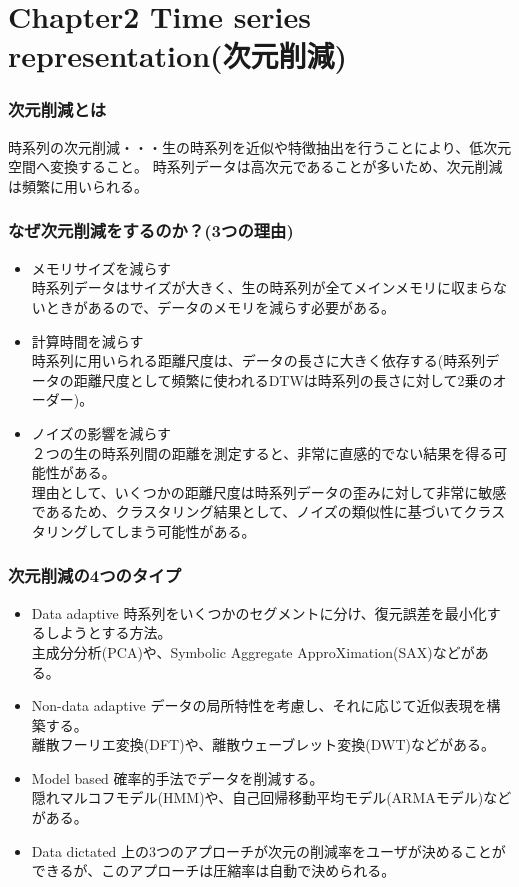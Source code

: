 \documentclass[dvipdfmx,11pt,notheorems]{beamer}
\theoremstyle{definition}
\begin{document}
\section{Chapter2 Time series representation(次元削減)}
\begin{frame}\frametitle{次元削減とは}

時系列の次元削減・・・生の時系列を近似や特徴抽出を行うことにより、低次元空間へ変換すること。
\newline
\newline
\newline
時系列データは高次元であることが多いため、次元削減は頻繁に用いられる。
\end{frame}



\begin{frame}\frametitle{なぜ次元削減をするのか？(3つの理由)}
\begin{itemize}
\item メモリサイズを減らす\\
時系列データはサイズが大きく、生の時系列が全てメインメモリに収まらないときがあるので、データのメモリを減らす必要がある。
\item 計算時間を減らす\\
時系列に用いられる距離尺度は、データの長さに大きく依存する(時系列データの距離尺度として頻繁に使われるDTWは時系列の長さに対して2乗のオーダー)。
\item ノイズの影響を減らす\\
２つの生の時系列間の距離を測定すると、非常に直感的でない結果を得る可能性がある。\\
理由として、いくつかの距離尺度は時系列データの歪みに対して非常に敏感であるため、クラスタリング結果として、ノイズの類似性に基づいてクラスタリングしてしまう可能性がある。

\end{itemize}
\end{frame}


\begin{frame}\frametitle{次元削減の4つのタイプ}
\begin{itemize}
\item Data adaptive
時系列をいくつかのセグメントに分け、復元誤差を最小化するしようとする方法。\\
主成分分析(PCA)や、Symbolic Aggregate ApproXimation(SAX)などがある。
\item Non-data adaptive
データの局所特性を考慮し、それに応じて近似表現を構築する。\\
離散フーリエ変換(DFT)や、離散ウェーブレット変換(DWT)などがある。
\item Model based
確率的手法でデータを削減する。\\
隠れマルコフモデル(HMM)や、自己回帰移動平均モデル(ARMAモデル)などがある。
\item Data dictated
上の3つのアプローチが次元の削減率をユーザが決めることができるが、このアプローチは圧縮率は自動で決められる。
\end{itemize}
\end{frame}
\end{document}
